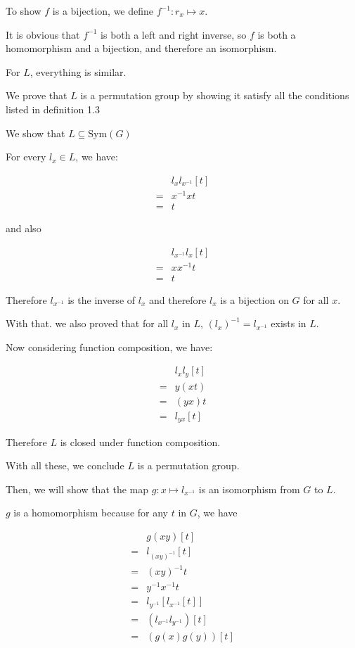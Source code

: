 To show $f$ is a bijection, we define $f^{-1}: r_x \mapsto x$.

It is obvious that $f^{-1}$ is both a left and right inverse, so $f$ is both a homomorphism and a bijection, and therefore an isomorphism.

For $L$, everything is similar.

We prove that $L$ is a permutation group by showing it satisfy all the conditions listed in definition 1.3

We show that $L \subseteq \text{Sym}(G)$

For every $ l_x \in L$, we have:

\begin{align*}
   & l_x l_{x^{-1}} [t] \\
  =& x^{-1}xt           \\
  =& t
\end{align*}

and also

\begin{align*}
   & l_{x^{-1}} l_x [t] \\
  =& xx^{-1}t           \\
  =& t
\end{align*}

Therefore $l_{x^{-1}}$ is the inverse of $l_x$ and therefore $l_x$ is a bijection on $G$ for all $x$.

With that. we also proved that for all $l_x$ in $L$, $(l_x)^{-1} = l_{x^{-1}} $ exists in $L$.

Now considering function composition, we have:

\begin{align*}
   & l_x l_y [t] \\
  =& y(xt)       \\
  =& (yx)t       \\
  =& l_{yx} [t]
\end{align*}

Therefore $L$ is closed under function composition. 

With all these, we conclude $ L $ is a permutation group.

Then, we will show that the map $g: x \mapsto l_{x^{-1}}$ is an isomorphism from $G$ to $L$.

$g$ is a homomorphism because for any $t$ in $G$, we have

\begin{align*}
   & g(xy)[t]                   \\
  =& l_{(xy)^{-1}}[t]           \\
  =& (xy)^{-1}t                 \\
  =& y^{-1}x^{-1}t              \\
  =& l_{y^{-1}}[l_{x^{-1}}[t]]  \\
  =& (l_{x^{-1}} l_{y^{-1}})[t] \\
  =& (g(x) g(y))[t]             \\
\end{align*}


